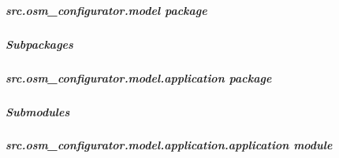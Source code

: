 \documentclass[letterpaper,10pt,english]{sphinxmanual}
\begin{document}
\subparagraph{src.osm\_configurator.model package}
\label{\detokenize{apidoc/src.osm_configurator.model:src-osm-configurator-model-package}}\label{\detokenize{apidoc/src.osm_configurator.model::doc}}

\subparagraph{Subpackages}
\label{\detokenize{apidoc/src.osm_configurator.model:subpackages}}
\sphinxstepscope


\subparagraph{src.osm\_configurator.model.application package}
\label{\detokenize{apidoc/src.osm_configurator.model.application:src-osm-configurator-model-application-package}}\label{\detokenize{apidoc/src.osm_configurator.model.application::doc}}

\subparagraph{Submodules}
\label{\detokenize{apidoc/src.osm_configurator.model.application:submodules}}

\subparagraph{src.osm\_configurator.model.application.application module}
\label{\detokenize{apidoc/src.osm_configurator.model.application:module-src.osm_configurator.model.application.application}}\label{\detokenize{apidoc/src.osm_configurator.model.application:src-osm-configurator-model-application-application-module}}
\end{document}
